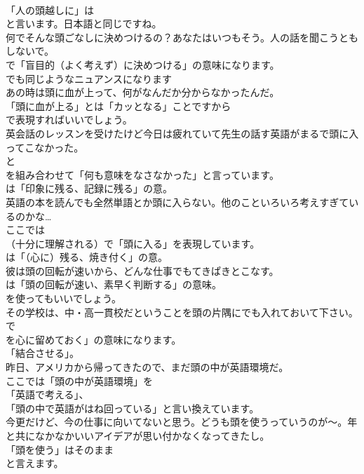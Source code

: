 \documentclass[8pt]{extreport}
\begin{document}
\begin{CJK}{UTF8}{min}
\\	「人の頭越しに」は
\\	と言います。日本語と同じですね。	
\\	何でそんな頭ごなしに決めつけるの？あなたはいつもそう。人の話を聞こうともしないで。 
\\	で「盲目的（よく考えず）に決めつける」の意味になります。
\\	でも同じようなニュアンスになります	
\\	あの時は頭に血が上って、何がなんだか分からなかったんだ。 
\\	「頭に血が上る」とは「カッとなる」ことですから
\\	で表現すればいいでしょう。	
\\	英会話のレッスンを受けたけど今日は疲れていて先生の話す英語がまるで頭に入ってこなかった。 
\\	と 
\\	を組み合わせて「何も意味をなさなかった」と言っています。
\\	は「印象に残る、記録に残る」の意。	
\\	英語の本を読んでも全然単語とか頭に入らない。他のこといろいろ考えすぎているのかな… 
\\	ここでは 
\\	（十分に理解される）で「頭に入る」を表現しています。
\\	は「（心に）残る、焼き付く」の意。	
\\	彼は頭の回転が速いから、どんな仕事でもてきぱきとこなす。 
\\	は「頭の回転が速い、素早く判断する」の意味。
\\	を使ってもいいでしょう。	
\\	その学校は、中・高一貫校だということを頭の片隅にでも入れておいて下さい。 
\\	で
\\	を心に留めておく」の意味になります。
\\	「結合させる」。	
\\	昨日、アメリカから帰ってきたので、まだ頭の中が英語環境だ。 
\\	ここでは「頭の中が英語環境」を
\\	「英語で考える」、
\\	「頭の中で英語がはね回っている」と言い換えています。	
\\	今更だけど、今の仕事に向いてないと思う。どうも頭を使うっていうのが～。年と共になかなかいいアイデアが思い付かなくなってきたし。 
\\	「頭を使う」はそのまま
\\	と言えます。

\end{CJK}
\end{document}
